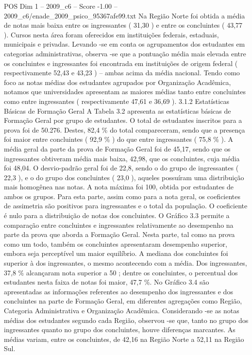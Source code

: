 \begin{textsample}{POS Dim 1 – 2009\_c6 – Score -1.00 – 2009\_c6/enade\_2009\_psico\_95367afe99.txt}
Na Região Norte foi obtida a média de notas mais baixa entre os ingressantes ( 31,30 ) e entre os concluintes ( 43,77 ).
Cursos nesta área foram oferecidos em instituições federais, estaduais, municipais e privadas.
Levando -se em conta os agrupamentos dos estudantes em categorias administrativas, observa -se que a pontuação média mais elevada entre os concluintes e ingressantes foi encontrada em instituições de origem federal ( respectivamente 52,43 e 43,23 ) – ambas acima da média nacional.
Tendo como foco as notas médias dos estudantes agrupados por Organização Acadêmica, notamos que universidades apresentam as maiores médias tanto entre concluintes como entre ingressantes ( respectivamente 47,61 e 36,69 ). 3.1.2 Estatísticas Básicas de Formação Geral A Tabela 3.2 apresenta as estatísticas básicas de Formação Geral por grupo de estudantes.
O total de estudantes inscritos para a prova foi de 50.276.
Destes, 82,4 \% do total compareceram, sendo que a presença foi maior entre concluintes ( 92,9 \% ) do que entre ingressantes ( 75,8 \% ).
A média geral da parte da prova de Formação Geral foi de 45,17, sendo que os ingressantes obtiveram média mais baixa, 42,98, que os concluintes, cuja média foi 48,04.
O desvio-padrão geral foi de 22,8, sendo o do grupo de ingressantes ( 22,3 ), e o do grupo dos concluintes ( 23,0 ), aqueles possuíram uma distribuição mais homogênea nas notas.
A nota máxima foi 100, obtida por estudantes de ambos os grupos.
Para esta parte, assim como para a nota geral, os coeficientes de assimetria são positivos para ingressantes e o total da população.
O coeficiente é nulo para a distribuição de notas dos concluintes.
O Gráfico 3.3 permite a comparação entre concluintes e ingressantes relativamente ao desempenho na parte da prova que aborda a Formação Geral.
Nesta parte, tal como na prova como um todo, também os concluintes apresentaram desempenho superior, embora seja perceptível um maior equilíbrio.
A mediana dos concluintes foi superior à dos ingressantes, o mesmo acontecendo com a média.
Dos ingressantes, 37,8 \% alcançaram nota superior a 50 ; dentre os concluintes, o percentual dos estudantes nesta faixa de notas foi maior, 47,7 \%.
No Gráfico 3.4 são apresentadas as informações referentes ao desempenho dos ingressantes e dos concluintes na parte de Formação Geral, em diferentes agregações como Região, Categoria Administrativa e Organização Acadêmica.
Considerando -se as notas médias dos estudantes segundo cada Região, observou -se que, tanto no grupo dos ingressantes quanto no grupo dos concluintes, houve diferenças marcantes.
As médias variam, entre os concluintes, de 42,16 na Região Norte a 52,11 na Região Sul.

\end{textsample}
